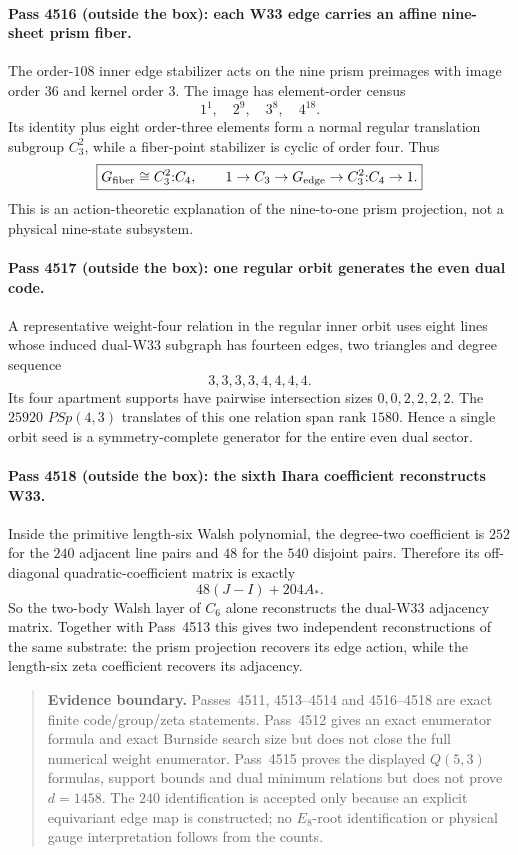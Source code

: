 \paragraph{Pass 4516 (outside the box): each W33 edge carries an affine nine-sheet prism fiber.}
The order-$108$ inner edge stabilizer acts on the nine prism preimages with image
order $36$ and kernel order $3$.  The image has element-order census
\[
1^1,\quad2^9,\quad3^8,\quad4^{18}.
\]
Its identity plus eight order-three elements form a normal regular translation
subgroup $C_3^2$, while a fiber-point stabilizer is cyclic of order four.  Thus
\[
 \boxed{G_{\rm fiber}\cong C_3^2{:}C_4,\qquad
        1\to C_3\to G_{\rm edge}\to C_3^2{:}C_4\to1.}
\]
This is an action-theoretic explanation of the nine-to-one prism projection, not
a physical nine-state subsystem.

\paragraph{Pass 4517 (outside the box): one regular orbit generates the even dual code.}
A representative weight-four relation in the regular inner orbit uses eight
lines whose induced dual-W33 subgraph has fourteen edges, two triangles and
degree sequence
\[
3,3,3,3,4,4,4,4.
\]
Its four apartment supports have pairwise intersection sizes
$0,0,2,2,2,2$.  The $25920$ $PSp(4,3)$ translates of this one relation span
rank $1580$.  Hence a single orbit seed is a symmetry-complete generator for the
entire even dual sector.

\paragraph{Pass 4518 (outside the box): the sixth Ihara coefficient reconstructs W33.}
Inside the primitive length-six Walsh polynomial, the degree-two coefficient is
$252$ for the $240$ adjacent line pairs and $48$ for the $540$ disjoint pairs.
Therefore its off-diagonal quadratic-coefficient matrix is exactly
\[
 \boxed{48(J-I)+204A_*.}
\]
So the two-body Walsh layer of $C_6$ alone reconstructs the dual-W33 adjacency
matrix.  Together with Pass~4513 this gives two independent reconstructions of
the same substrate: the prism projection recovers its edge action, while the
length-six zeta coefficient recovers its adjacency.

\begin{quote}\small
\textbf{Evidence boundary.}  Passes~4511, 4513--4514 and 4516--4518 are exact
finite code/group/zeta statements.  Pass~4512 gives an exact enumerator formula
and exact Burnside search size but does not close the full numerical weight
enumerator.  Pass~4515 proves the displayed $Q(5,3)$ formulas, support bounds and
dual minimum relations but does not prove $d=1458$.  The $240$ identification is
accepted only because an explicit equivariant edge map is constructed; no
$E_8$-root identification or physical gauge interpretation follows from the
counts.
\end{quote}
